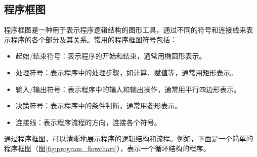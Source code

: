 \subsection{程序框图}
程序框图是一种用于表示程序逻辑结构的图形工具，通过不同的符号和连接线来表示程序的各个部分及其关系。常用的程序框图符号包括：
\begin{itemize}
      \item 起始/结束符号：表示程序的开始和结束，通常用椭圆形表示。
      \item 处理符号：表示程序中的处理步骤，如计算、赋值等，通常用矩形表示。
      \item 输入/输出符号：表示程序中的输入和输出操作，通常用平行四边形表示。
      \item 决策符号：表示程序中的条件判断，通常用菱形表示。
      \item 连接线：表示程序流程的方向，连接各个符号。
\end{itemize}
通过程序框图，可以清晰地展示程序的逻辑结构和流程。例如，下面是一个简单的程序框图（图\ref{fig:program_flowchart}），表示一个循环结构的程序。
